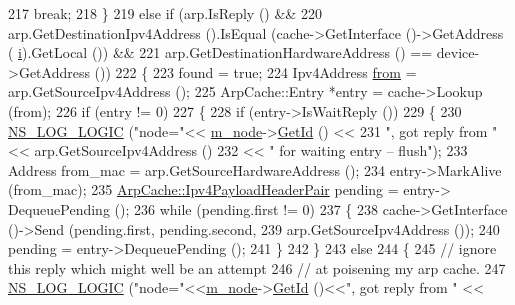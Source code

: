 \begin{DoxyCode}
217           \textcolor{keywordflow}{break};
218         \} 
219       \textcolor{keywordflow}{else} \textcolor{keywordflow}{if} (arp.IsReply () && 
220                arp.GetDestinationIpv4Address ().IsEqual (cache->GetInterface ()->GetAddress (
      \hyperlink{bernuolliDistribution_8m_a6f6ccfcf58b31cb6412107d9d5281426}{i}).GetLocal ()) &&
221                arp.GetDestinationHardwareAddress () == device->GetAddress ())
222         \{
223           found = \textcolor{keyword}{true};
224           Ipv4Address \hyperlink{lte__amc_8m_a1b4c81ff74eb1a626b5ade44c81004b3}{from} = arp.GetSourceIpv4Address ();
225           ArpCache::Entry *entry = cache->Lookup (from);
226           \textcolor{keywordflow}{if} (entry != 0)
227             \{
228               \textcolor{keywordflow}{if} (entry->IsWaitReply ()) 
229                 \{
230                   \hyperlink{group__logging_ga88acd260151caf2db9c0fc84997f45ce}{NS\_LOG\_LOGIC} (\textcolor{stringliteral}{"node="}<< \hyperlink{classns3_1_1ArpL3Protocol_aa1a2d173cfb3fd7e2f8eff8504a114da}{m\_node}->\hyperlink{classns3_1_1Node_aaf49b64a843565ce3812326313b370ac}{GetId} () << 
231                                 \textcolor{stringliteral}{", got reply from "} << arp.GetSourceIpv4Address ()
232                                        << \textcolor{stringliteral}{" for waiting entry -- flush"});
233                   Address from\_mac = arp.GetSourceHardwareAddress ();
234                   entry->MarkAlive (from\_mac);
235                   \hyperlink{classns3_1_1ArpCache_ad018741a53ccc6cdb8b05fdd4873ef3d}{ArpCache::Ipv4PayloadHeaderPair} pending = entry->
      DequeuePending ();
236                   \textcolor{keywordflow}{while} (pending.first != 0)
237                     \{
238                       cache->GetInterface ()->Send (pending.first, pending.second,
239                                                     arp.GetSourceIpv4Address ());
240                       pending = entry->DequeuePending ();
241                     \}
242                 \} 
243               \textcolor{keywordflow}{else} 
244                 \{
245                   \textcolor{comment}{// ignore this reply which might well be an attempt }
246                   \textcolor{comment}{// at poisening my arp cache.}
247                   \hyperlink{group__logging_ga88acd260151caf2db9c0fc84997f45ce}{NS\_LOG\_LOGIC} (\textcolor{stringliteral}{"node="}<<\hyperlink{classns3_1_1ArpL3Protocol_aa1a2d173cfb3fd7e2f8eff8504a114da}{m\_node}->\hyperlink{classns3_1_1Node_aaf49b64a843565ce3812326313b370ac}{GetId} ()<<\textcolor{stringliteral}{", got reply from "} <<

\end{DoxyCode}
